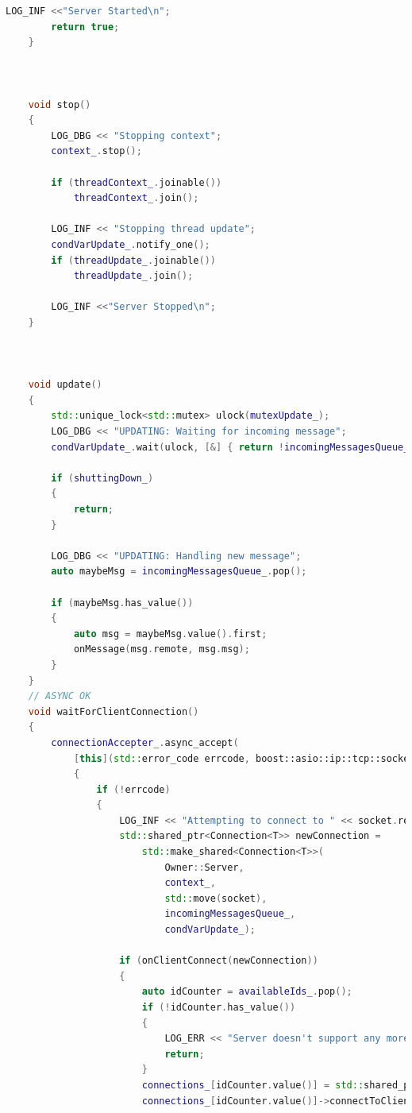 \documentclass[17pt]{article}
\begin{document}
\begin{lstlisting}[language = C++]
        LOG_INF <<"Server Started\n";
        return true;
    }



    void stop()
    {
        LOG_DBG << "Stopping context";
        context_.stop();
        
        if (threadContext_.joinable())
            threadContext_.join();
        
        LOG_INF << "Stopping thread update";
        condVarUpdate_.notify_one();
        if (threadUpdate_.joinable())
            threadUpdate_.join();

        LOG_INF <<"Server Stopped\n";
    }



    void update()
    {
        std::unique_lock<std::mutex> ulock(mutexUpdate_);
        LOG_DBG << "UPDATING: Waiting for incoming message";
        condVarUpdate_.wait(ulock, [&] { return !incomingMessagesQueue_.empty() || shuttingDown_; });

        if (shuttingDown_)
        {
            return;
        }

        LOG_DBG << "UPDATING: Handling new message";
        auto maybeMsg = incomingMessagesQueue_.pop();
    
        if (maybeMsg.has_value())
        {
            auto msg = maybeMsg.value().first;
            onMessage(msg.remote, msg.msg);
        }
    }
    // ASYNC OK
    void waitForClientConnection()
    {
        connectionAccepter_.async_accept(
            [this](std::error_code errcode, boost::asio::ip::tcp::socket socket)
            {
                if (!errcode)
                {
                    LOG_INF << "Attempting to connect to " << socket.remote_endpoint();
                    std::shared_ptr<Connection<T>> newConnection = 
                        std::make_shared<Connection<T>>(
                            Owner::Server, 
                            context_,
                            std::move(socket),
                            incomingMessagesQueue_,
                            condVarUpdate_);
            
                    if (onClientConnect(newConnection))
                    {
                        auto idCounter = availableIds_.pop();
                        if (!idCounter.has_value())
                        {
                            LOG_ERR << "Server doesn't support any more connections. Denied!";
                            return;
                        }
                        connections_[idCounter.value()] = std::shared_ptr<Connection<T>>(std::move(newConnection));
                        connections_[idCounter.value()]->connectToClient(idCounter.value());


\end{lstlisting}
\end{document}
